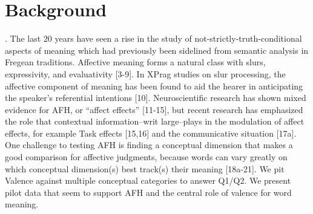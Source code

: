 \section{Background}.
The last 20 years have seen a rise in the study of not-strictly-truth-conditional aspects of meaning which had previously been sidelined from semantic analysis in Fregean traditions. Affective meaning forms a natural class with slurs, expressivity, and evaluativity [3-9]. In XPrag studies on slur processing, the affective component of meaning has been found to aid the hearer in anticipating the speaker's referential intentions [10]. Neuroscientific research has shown mixed evidence for AFH, or ``affect effects'' [11-15], but recent research has emphasized the role that contextual information--writ large--plays in the modulation of affect effects, for example Task effects [15,16] and the communicative situation [17a]. One challenge to testing AFH is finding a conceptual dimension that makes a good comparison for affective judgments, because words can vary greatly on which conceptual dimension(s) best track(s) their meaning [18a-21]. We pit Valence against multiple conceptual categories to answer Q1/Q2. We present pilot data that seem to support AFH and the central role of valence for word meaning.\\


